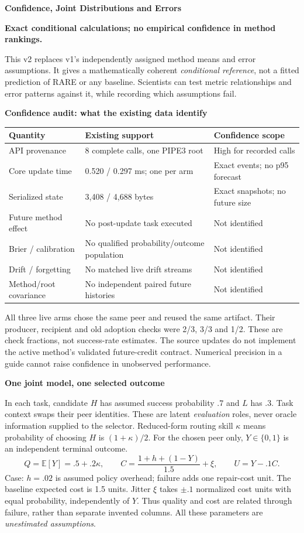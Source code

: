 \documentclass[10pt,a4paper]{article}
\newcommand{\lead}[1]{\vspace{3pt}\textbf{#1}\par}
\newcommand{\status}{\textcolor{red!70!black}{\textbf{Exact conditional calculations; no empirical confidence in method rankings.}}\par}
\begin{document}
{\Large\bfseries Confidence, Joint Distributions and Errors}\par\status
This v2 replaces v1's independently assigned method means and error assumptions.
It gives a mathematically coherent \emph{conditional reference}, not a fitted
prediction of RARE or any baseline. Scientists can test metric relationships
and error patterns against it, while recording which assumptions fail.

\lead{Confidence audit: what the existing data identify}
\begin{center}\small
\begin{tabular*}{\linewidth}{@{\extracolsep{\fill}}lll@{}}\toprule
Quantity & Existing support & Confidence scope\\\midrule
API provenance & 8 complete calls, one PIPE3 root & High for recorded calls\\
Core update time & 0.520 / 0.297 ms; one per arm & Exact events; no p95 forecast\\
Serialized state & 3,408 / 4,688 bytes & Exact snapshots; no future size\\
Future method effect & No post-update task executed & Not identified\\
Brier / calibration & No qualified probability/outcome population & Not identified\\
Drift / forgetting & No matched live drift streams & Not identified\\
Method/root covariance & No independent paired future histories & Not identified\\\bottomrule
\end{tabular*}\end{center}
All three live arms chose the same peer and reused the same artifact. Their
producer, recipient and old adoption checks were 2/3, 3/3 and 1/2. These are
check fractions, not success-rate estimates. The source updates do not implement
the active method's validated future-credit contract. Numerical precision in a
guide cannot raise confidence in unobserved performance.

\lead{One joint model, one selected outcome}
In each task, candidate $H$ has assumed success probability $.7$ and $L$ has
$.3$. Task context swaps their peer identities. These are latent \emph{evaluation}
roles, never oracle information supplied to the selector. Reduced-form routing
skill $\kappa$ means probability of choosing $H$ is $(1+\kappa)/2$.
For the chosen peer only, $Y\in\{0,1\}$ is an independent terminal outcome.
\[
 Q=\mathbb E[Y]=.5+.2\kappa,\qquad
 C=\frac{1+h+(1-Y)}{1.5}+\xi,\qquad U=Y-.1C.
\]
Case: $h=.02$ is assumed policy overhead; failure adds one repair-cost unit.
The baseline expected cost is 1.5 units. Jitter $\xi$ takes $\pm.1$ normalized
cost units with equal probability, independently of $Y$. Thus quality and
cost are related through failure, rather than separate invented columns.
All these parameters are \emph{unestimated assumptions}.
\end{document}

